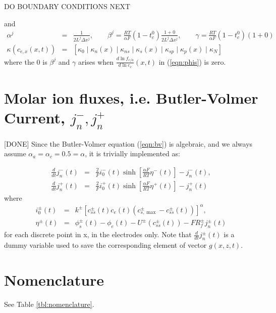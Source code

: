 \documentclass[12pt]{article}
\newcommand{\green}[1]{{\color{green}#1}}
\begin{document}
DO BOUNDARY CONDITIONS NEXT

and
\begin{eqnarray}
	\alpha^{j} &=& \frac{1}{2 L^{j} \Delta x^{j}}, \qquad \beta^{j} = \frac{RT}{\alpha F} (1-t_{c}^{0})\frac{1 + 0}{2 L^{j} \Delta x^{j}}, \qquad \gamma = \frac{RT}{\alpha F} (1-t_{c}^{0}) (1 + 0) \\
	\kappa(c_{e,x}(x,t)) &=& \left[ \kappa_{0} \mid \kappa_{n}(x) \mid \kappa_{ns} \mid \kappa_{s}(x) \mid \kappa_{sp} \mid \kappa_{p}(x) \mid \kappa_{N} \right]
\end{eqnarray}
where the $0$ is $\beta^{j}$ and $\gamma$ arises when $\frac{d \ln f_{c/a}}{d \ln c_{e}}(x,t)$ in (\ref{eqn:phis}) is zero. 

\section{Molar ion fluxes, i.e. Butler-Volmer Current, $j_{n}^{-}, j_{n}^{+}$}\label{sec:jn}
\green{[DONE]} Since the Butler-Volmer equation (\ref{eqn:bv}) is algebraic, and we always assume $\alpha_{a} = \alpha_{c} = 0.5 = \alpha$, it is trivially implemented as:

\begin{eqnarray}
	\frac{d}{dt} j_{n}^{-}(t) &=& \frac{2}{F} i_{0}^{-}(t) \sinh \left[ \frac{\alpha F}{RT} \eta^{-}(t) \right] - j_{n}^{-}(t), \\
	\frac{d}{dt} j_{n}^{+}(t) &=& \frac{2}{F} i_{0}^{+}(t) \sinh \left[ \frac{\alpha F}{RT} \eta^{+}(t) \right] - j_{n}^{+}(t)
\end{eqnarray}
where
\begin{eqnarray}
	i_{0}^{\pm}(t) &=& k^{\pm}  \left[ c_{ss}^{\pm}(t) c_{e}(t) \left(c_{s,\max}^{\pm} - c_{ss}^{\pm}(t)  \right) \right]^{\alpha}, \label{eqn:i0} \\
	\eta^{\pm}(t) &=& \phi_{s}^{\pm}(t) - \phi_{e}(t) - U^{\pm}(c_{ss}^{\pm}(t)) - F R_{f}^{\pm} j_{n}^{\pm}(t)
\end{eqnarray}
for each discrete point in x, in the electrodes only. Note that $\frac{d}{dt} j_{n}^{\pm}(t)$ is a dummy variable used to save the corresponding element of vector $g(x,z,t)$.

\section{Nomenclature}
See Table \ref{tbl:nomenclature}.
\end{document}
